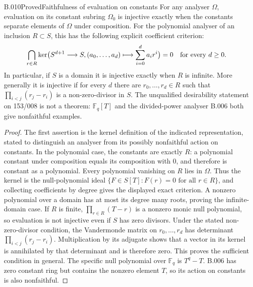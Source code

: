 \begin{saresult}{B.010}{Proved}{Faithfulness of evaluation on constants}
For any analyser $\Omega$, evaluation on its constant subring
$\Omega_0$ is injective exactly when the constants separate
elements of $\Omega$ under composition. For the polynomial analyser
of an inclusion $R\subset S$, this has the following explicit
coefficient criterion:
\[
 \bigcap_{r\in R}\ker\bigl(S^{d+1}\longrightarrow S,
 (a_0,\ldots,a_d)\longmapsto\sum_{i=0}^d a_i r^i\bigr)=0
 \quad\hbox{for every }d\ge0.
\]
In particular, if $S$ is a domain it is injective exactly when
$R$ is infinite. More generally it is injective if for every $d$
there are $r_0,\ldots,r_d\in R$ such that
$\prod_{i<j}(r_j-r_i)$ is a non-zero-divisor in $S$.
The unqualified desirability statement on 153/008 is not a theorem:
$\mathbb F_q[T]$ and the divided-power analyser B.006 both give
nonfaithful examples.
\end{saresult}
\begin{proof}
The first assertion is the kernel definition of the indicated
representation, stated to distinguish an analyser from its
possibly nonfaithful action on constants. In the polynomial case,
the constants are exactly $R$: a polynomial constant under
composition equals its composition with $0$, and therefore is
constant as a polynomial. Every polynomial vanishing on $R$ lies
in $\Omega$. Thus the kernel is the null-polynomial ideal
$\{F\in S[T]:F(r)=0\text{ for all }r\in R\}$, and collecting
coefficients by degree gives the displayed exact criterion.
A nonzero polynomial over a domain has at most its degree many
roots, proving the infinite-domain case. If $R$ is finite,
$\prod_{r\in R}(T-r)$ is a nonzero monic null polynomial, so
evaluation is not injective even if $S$ has zero divisors.
Under the stated non-zero-divisor condition, the Vandermonde
matrix on $r_0,\ldots,r_d$ has determinant
$\prod_{i<j}(r_j-r_i)$. Multiplication by its adjugate shows that
a vector in its kernel is annihilated by that determinant and
is therefore zero. This proves the sufficient condition in
general. The specific null polynomial over $\mathbb F_q$ is
$T^q-T$. B.006 has zero constant ring but contains the nonzero
element $T$, so its action on constants is also nonfaithful.
\end{proof}

